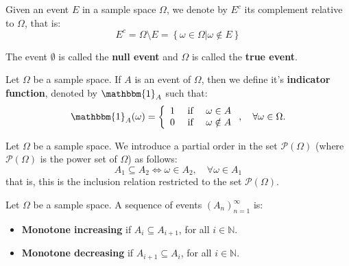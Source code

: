 \documentclass[12pt]{report}
\theoremstyle{largebreak}
\newcommand{\bbm}[1]{\mathbbm{#1}}
\newcommand{\pot}[1]{\mathcal{P}\left(#1\right)}
\begin{document}
    \begin{obs}
        Given an event $E$ in a sample space $\Omega$, we denote by $E^c$ its complement relative to $\Omega$, that is:
        \begin{equation*}
            E^c=\Omega\setminus E=\left\{\omega\in\Omega\Big|\omega\notin E \right\}
        \end{equation*}
    \end{obs}

    The event $\emptyset$ is called the \textbf{null event} and $\Omega$ is called the \textbf{true event}.

    \begin{mydef}
        Let $\Omega$ be a sample space. If $A$ is an event of $\Omega$, then we define it's \textbf{indicator function}, denoted by $\bbm{1}_A$ such that:
        \begin{equation*}
            \bbm{1}_A(\omega)=\left\{
                \begin{array}{lcr}
                    1 & \textup{ if } & \omega\in A\\
                    0 & \textup{ if } & \omega\notin A\\
                \end{array}
            \right.,\quad\forall\omega\in\Omega.
        \end{equation*}
    \end{mydef}

    Let $\Omega$ be a sample space. We introduce a partial order in the set $\pot{\Omega}$ (where $\pot{\Omega}$ is the power set of $\Omega$) as follows:
    \begin{equation*}
        A_1\subseteq A_2\iff \omega\in A_2,\quad\forall \omega\in A_1
    \end{equation*}
    that is, this is the inclusion relation restricted to the set $\pot{\Omega}$.

    \begin{mydef}
        Let $\Omega$ be a sample space. A sequence of events $\left(A_n\right)_{ n=1}^\infty$ is:
        \begin{itemize}
            \item \textbf{Monotone increasing} if $A_i\subseteq A_{i+1}$, for all $i\in\mathbb{N}$.
            \item \textbf{Monotone decreasing} if $A_{i+1}\subseteq A_i$, for all $i\in\mathbb{N}$.
        \end{itemize}
    \end{mydef}
\end{document}
